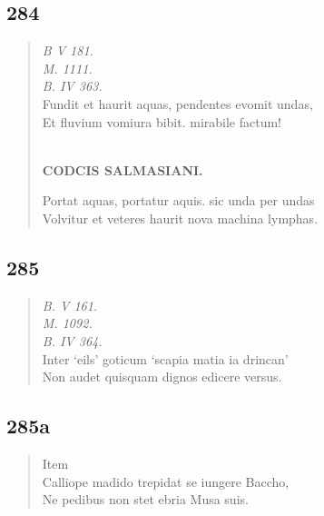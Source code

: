 \documentclass[11pt, a4paper]{report}
\begin{document}
            \subsection*{284}
      \begin{verse}
      \textit{B V 181.} \\ \textit{M. 1111.} \\ \textit{B. IV 363.} \\ Fundit et haurit aquas, pendentes evomit undas, \\ Et fluvium vomiura bibit. mirabile factum! \\ 
        ﻿\pagebreak 
    \begin{center} \textbf{CODCIS SALMASIANI.} \end{center} \marginpar{[001]} Portat aquas, portatur aquis. sic unda per undas \\ Volvitur et veteres haurit nova machina lymphas. \\ 
      \end{verse}
  
            \subsection*{285}
      \begin{verse}
      \textit{B. V 161.} \\ \textit{M. 1092.} \\ \textit{B. IV 364.} \\ Inter ‘eils’ goticum ‘scapia matia ia drincan’ \\ Non audet quisquam dignos edicere versus. \\ 
      \end{verse}
  
            \subsection*{285a}
      \begin{verse}
       \lbrack Item \rbrack  \\ Calliope madido trepidat se iungere Baccho, \\ Ne pedibus non stet ebria Musa suis. \\ 
      \end{verse}
  
\end{document}
